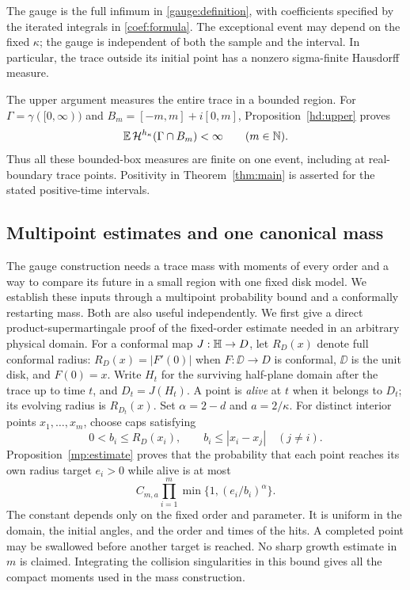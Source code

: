The gauge is the full infimum in \eqref{gauge:definition}, with
coefficients specified by the iterated integrals in \eqref{coef:formula}.
The exceptional event may depend on the fixed $\kappa$; the gauge
is independent of both the sample and the interval.
In particular, the trace outside its initial point has a nonzero
sigma-finite Hausdorff measure.

The upper argument measures the entire trace in a bounded region.
For $\Gamma=\gamma([0,\infty))$ and
$B_m=[-m,m]+i[0,m]$, Proposition~\ref{hd:upper} proves
\begin{equation}
 \mathbb E\,\mathcal H^{h_\kappa}(\Gamma\cap B_m)<\infty
 \qquad(m\in\mathbb N).
 \label{intro:box-mean}
\end{equation}
Thus all these bounded-box measures are finite on one event, including
at real-boundary trace points. Positivity in Theorem~\ref{thm:main}
is asserted for the stated positive-time intervals.

\subsection{Multipoint estimates and one canonical mass}

The gauge construction needs a trace mass with moments of every order
and a way to compare its future in a small region with one fixed disk
model. We establish these inputs through a multipoint probability bound
and a conformally restarting mass. Both are also useful independently.
We first give a direct product-supermartingale proof of the fixed-order
estimate needed in an arbitrary physical domain.
For a conformal map $J:\mathbb H\to D$, let $R_D(x)$ denote full conformal
radius: $R_D(x)=|F'(0)|$ when $F:\DD\to D$ is conformal,
$\DD$ is the unit disk, and $F(0)=x$.
Write $H_t$ for the surviving half-plane domain after the trace up to
time $t$, and $D_t=J(H_t)$. A point is \emph{alive} at $t$ when it
belongs to $D_t$; its evolving radius is $R_{D_t}(x)$.
Set $\alpha=2-d$ and $a=2/\kappa$.
For distinct interior points $x_1,\ldots,x_m$, choose caps satisfying
\[
 0<b_i\le R_D(x_i),\qquad b_i\le |x_i-x_j|\quad(j\ne i).
\]
Proposition~\ref{mp:estimate} proves that the probability that each point
reaches its own radius target $e_i>0$ while alive is at most
\begin{equation}
 C_{m,a}\prod_{i=1}^m\min\{1,(e_i/b_i)^\alpha\}.
 \label{intro:multipoint}
\end{equation}
The constant depends only on the fixed order and parameter. It is
uniform in the domain, the initial angles, and the order and times of
the hits. A completed point may be swallowed before another target is
reached. No sharp growth estimate in $m$ is claimed. Integrating the
collision singularities in this bound gives all the compact moments
used in the mass construction.

